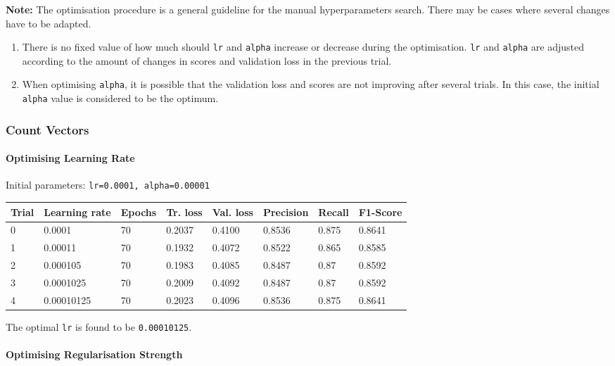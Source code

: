 \documentclass[11pt]{article}
\begin{document}
\textbf{Note:} The optimisation procedure is a general guideline for the
manual hyperparameters search. There may be cases where several changes
have to be adapted.

\begin{enumerate}
\def\labelenumi{\arabic{enumi}.}
\item
  There is no fixed value of how much should \texttt{lr} and
  \texttt{alpha} increase or decrease during the optimisation.
  \texttt{lr} and \texttt{alpha} are adjusted according to the amount of
  changes in scores and validation loss in the previous trial.
\item
  When optimising \texttt{alpha}, it is possible that the validation
  loss and scores are not improving after several trials. In this case,
  the initial \texttt{alpha} value is considered to be the optimum.
\end{enumerate}

\hypertarget{count-vectors}{%
\subsubsection{Count Vectors}\label{count-vectors}}

\hypertarget{optimising-learning-rate}{%
\paragraph{Optimising Learning Rate}\label{optimising-learning-rate}}

Initial parameters: \texttt{lr=0.0001,\ alpha=0.00001}

\begin{longtable}[]{@{}llllllll@{}}
\toprule
Trial & Learning rate & Epochs & Tr. loss & Val. loss & Precision &
Recall & F1-Score\tabularnewline
\midrule
\endhead
0 & 0.0001 & 70 & 0.2037 & 0.4100 & 0.8536 & 0.875 &
0.8641\tabularnewline
1 & 0.00011 & 70 & 0.1932 & 0.4072 & 0.8522 & 0.865 &
0.8585\tabularnewline
2 & 0.000105 & 70 & 0.1983 & 0.4085 & 0.8487 & 0.87 &
0.8592\tabularnewline
3 & 0.0001025 & 70 & 0.2009 & 0.4092 & 0.8487 & 0.87 &
0.8592\tabularnewline
4 & 0.00010125 & 70 & 0.2023 & 0.4096 & 0.8536 & 0.875 &
0.8641\tabularnewline
\bottomrule
\end{longtable}

The optimal \texttt{lr} is found to be \texttt{0.00010125}.

\hypertarget{optimising-regularisation-strength}{%
\paragraph{Optimising Regularisation
Strength}\label{optimising-regularisation-strength}}
\end{document}
